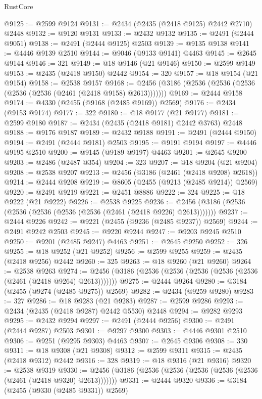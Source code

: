 \begin{lexlean}{RustCore}
\begin{coremodule}
@9125 := @2599 @9124
@9131 := @2434 (@2435 (@2418 @9125) @2442 @2710) @2448
@9132 := @9120 @9131
@9133 := @2432 @9132
@9135 := @2491 (@2444 @9051)
@9138 := @2491 (@2444 @9125) @2503
@9139 := @9135 @9138
@9141 := @4446 @9139 @2510
@9144 := @9046 (@9133 @9141) @4463
@9145 := @2645 @9144
@9146 := 321
@9149 := @18 @9146 (@21 @9146)
@9150 := @2599 @9149
@9153 := @2435 (@2418 @9150) @2442
@9154 := 320
@9157 := @18 @9154 (@21 @9154)
@9158 := @2538 @9157
@9168 := @2456 (@3186 (@2536 (@2536 (@2536 (@2536 (@2536 (@2461 (@2418 @9158) @2613)))))))
@9169 := @2444 @9158
@9174 := @4330 (@2455 (@9168 (@2485 @9169)) @2569)
@9176 := @2434 (@9153 @9174)
@9177 := 322
@9180 := @18 @9177 (@21 @9177)
@9181 := @2599 @9180
@9187 := @2434 (@2435 (@2418 @9181) @2442 @3763) @2448
@9188 := @9176 @9187
@9189 := @2432 @9188
@9191 := @2491 (@2444 @9150)
@9194 := @2491 (@2444 @9181) @2503
@9195 := @9191 @9194
@9197 := @4446 @9195 @2510
@9200 := @9145 (@9189 @9197) @4463
@9201 := @2645 @9200
@9203 := @2486 (@2487 @354)
@9204 := 323
@9207 := @18 @9204 (@21 @9204)
@9208 := @2538 @9207
@9213 := @2456 (@3186 (@2461 (@2418 @9208) @2618))
@9214 := @2444 @9208
@9219 := @8605 (@2455 (@9213 (@2485 @9214)) @2569)
@9220 := @2491 @9219
@9221 := @2451 @8886
@9222 := 324
@9225 := @18 @9222 (@21 @9222)
@9226 := @2538 @9225
@9236 := @2456 (@3186 (@2536 (@2536 (@2536 (@2536 (@2536 (@2461 (@2418 @9226) @2613)))))))
@9237 := @2444 @9226
@9242 := @9221 (@2455 (@9236 (@2485 @9237)) @2569)
@9244 := @2491 @9242 @2503
@9245 := @9220 @9244
@9247 := @9203 @9245 @2510
@9250 := @9201 (@2485 @9247) @4463
@9251 := @2645 @9250
@9252 := 326
@9255 := @18 @9252 (@21 @9252)
@9256 := @2599 @9255
@9259 := @2435 (@2418 @9256) @2442
@9260 := 325
@9263 := @18 @9260 (@21 @9260)
@9264 := @2538 @9263
@9274 := @2456 (@3186 (@2536 (@2536 (@2536 (@2536 (@2536 (@2461 (@2418 @9264) @2613)))))))
@9275 := @2444 @9264
@9280 := @3184 (@2455 (@9274 (@2485 @9275)) @2569)
@9282 := @2434 (@9259 @9280)
@9283 := 327
@9286 := @18 @9283 (@21 @9283)
@9287 := @2599 @9286
@9293 := @2434 (@2435 (@2418 @9287) @2442 @5530) @2448
@9294 := @9282 @9293
@9295 := @2432 @9294
@9297 := @2491 (@2444 @9256)
@9300 := @2491 (@2444 @9287) @2503
@9301 := @9297 @9300
@9303 := @4446 @9301 @2510
@9306 := @9251 (@9295 @9303) @4463
@9307 := @2645 @9306
@9308 := 330
@9311 := @18 @9308 (@21 @9308)
@9312 := @2599 @9311
@9315 := @2435 (@2418 @9312) @2442
@9316 := 328
@9319 := @18 @9316 (@21 @9316)
@9320 := @2538 @9319
@9330 := @2456 (@3186 (@2536 (@2536 (@2536 (@2536 (@2536 (@2461 (@2418 @9320) @2613)))))))
@9331 := @2444 @9320
@9336 := @3184 (@2455 (@9330 (@2485 @9331)) @2569)

\end{coremodule}
\end{lexlean}
